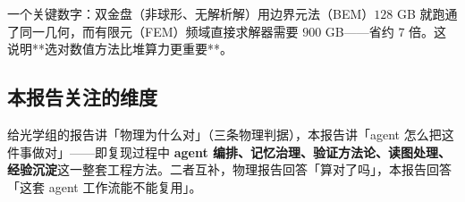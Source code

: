 \begin{important}
一个关键数字：双金盘（非球形、无解析解）用边界元法（BEM）$128$ GB 就跑通了同一几何，而有限元（FEM）频域直接求解器需要 $900$ GB——省约 $7$ 倍。这说明**选对数值方法比堆算力更重要**。
\end{important}

\subsection{本报告关注的维度}

给光学组的报告讲「物理为什么对」（三条物理判据），本报告讲「agent 怎么把这件事做对」——即复现过程中 \textbf{agent 编排、记忆治理、验证方法论、读图处理、经验沉淀}这一整套工程方法。二者互补，物理报告回答「算对了吗」，本报告回答「这套 agent 工作流能不能复用」。
